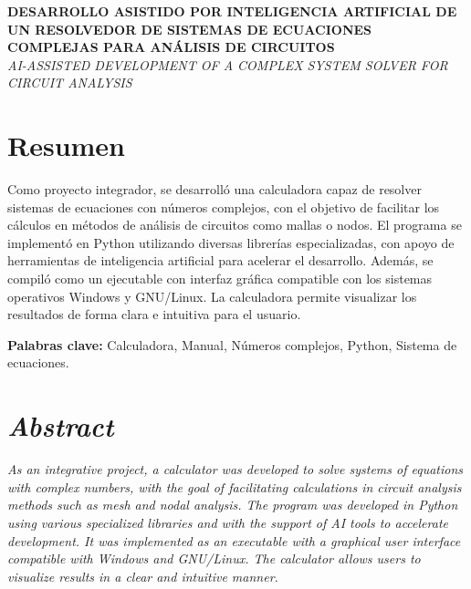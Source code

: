 \documentclass[12pt,a4paper]{article}
\begin{document}
\begingroup
{}
\begin{center}
  {\fontsize{16}{18}\bfseries \MakeUppercase{Desarrollo asistido por Inteligencia Artificial de un resolvedor de sistemas de ecuaciones complejas para análisis de circuitos}}\\[0.5cm]
  {\fontsize{14}{16}\itshape \MakeUppercase{AI-Assisted Development of a Complex System Solver for Circuit Analysis}}\\[1cm]





\end{center}
\endgroup

\section*{Resumen}

Como proyecto integrador, se desarrolló una calculadora capaz de resolver sistemas de ecuaciones con números complejos, con el objetivo de facilitar los cálculos en métodos de análisis de circuitos como mallas o nodos.
El programa se implementó en Python utilizando diversas librerías especializadas, con apoyo de herramientas de inteligencia artificial para acelerar el desarrollo. Además, se compiló como un ejecutable con interfaz gráfica compatible con los sistemas operativos Windows y GNU/Linux. La calculadora permite visualizar los resultados de forma clara e intuitiva para el usuario.

\noindent \textbf{Palabras clave:} Calculadora, Manual, Números complejos, Python, Sistema de ecuaciones.

\section*{\itshape Abstract}
\textit{
As an integrative project, a calculator was developed to solve systems of equations with complex numbers, with the goal of facilitating calculations in circuit analysis methods such as mesh and nodal analysis. The program was developed in Python using various specialized libraries and with the support of AI tools to accelerate development. It was implemented as an executable with a graphical user interface compatible with Windows and GNU/Linux. The calculator allows users to visualize results in a clear and intuitive manner.
}
\end{document}
